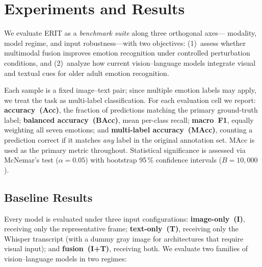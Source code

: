 
\section{Experiments and Results}
\label{sec:results}

We evaluate ERIT as a \emph{benchmark suite} along three orthogonal axes---
modality, model regime, and input robustness---with two objectives:
(1)~assess whether multimodal fusion improves emotion recognition under
controlled perturbation conditions, and
(2)~analyze how current vision--language models integrate visual and
textual cues for older adult emotion recognition.

Each sample is a fixed image--text pair; since multiple emotion labels may
apply, we treat the task as multi-label classification.  For each
evaluation cell we report:
\textbf{accuracy~(Acc)}, the fraction of predictions matching the primary
ground-truth label;
\textbf{balanced accuracy~(BAcc)}, mean per-class recall;
\textbf{macro~F1}, equally weighting all seven emotions; and
\textbf{multi-label accuracy~(MAcc)}, counting a prediction correct if it
matches \emph{any} label in the original annotation set.
MAcc is used as the primary metric throughout.
Statistical significance is assessed via McNemar's test ($\alpha = 0.05$)
with bootstrap 95\,\% confidence intervals ($B = 10{,}000$).



\subsection{Baseline Results}
\label{sec:baseline-results}

Every model is evaluated under three input configurations:
\textbf{image-only~(I)}, receiving only the representative frame;
\textbf{text-only~(T)}, receiving only the Whisper transcript (with a dummy
gray image for architectures that require visual input); and
\textbf{fusion~(I+T)}, receiving both.  We evaluate two families of
vision--language models in two regimes:

